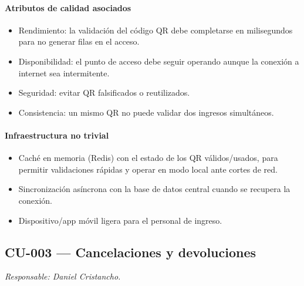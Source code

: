 \paragraph{Atributos de calidad asociados}
\begin{itemize}[leftmargin=1.4em, topsep=1pt]
  \item Rendimiento: la validación del código QR debe completarse en milisegundos para no generar filas en el acceso.
  \item Disponibilidad: el punto de acceso debe seguir operando aunque la conexión a internet sea intermitente.
  \item Seguridad: evitar QR falsificados o reutilizados.
  \item Consistencia: un mismo QR no puede validar dos ingresos simultáneos.
\end{itemize}

\paragraph{Infraestructura no trivial}
\begin{itemize}[leftmargin=1.4em, topsep=1pt]
  \item Caché en memoria (Redis) con el estado de los QR válidos/usados, para permitir validaciones rápidas y operar en modo local ante cortes de red.
  \item Sincronización asíncrona con la base de datos central cuando se recupera la conexión.
  \item Dispositivo/app móvil ligera para el personal de ingreso.
\end{itemize}

\subsection{CU-003 --- Cancelaciones y devoluciones}
\label{cu:cu-003}
\textit{Responsable: Daniel Cristancho.}


